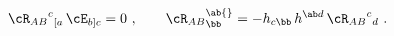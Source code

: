 \begin{equation}
  {\cR_{AB}}^c{}_{[a}\, \cE_{b]c}=0\ ,\qquad {\cR_{AB}}^\ab{}_\bb = -
  h_{c\bb}\, h^{\ab d}\, {\cR_{AB}}^c{}_d\ .
 \end{equation}

